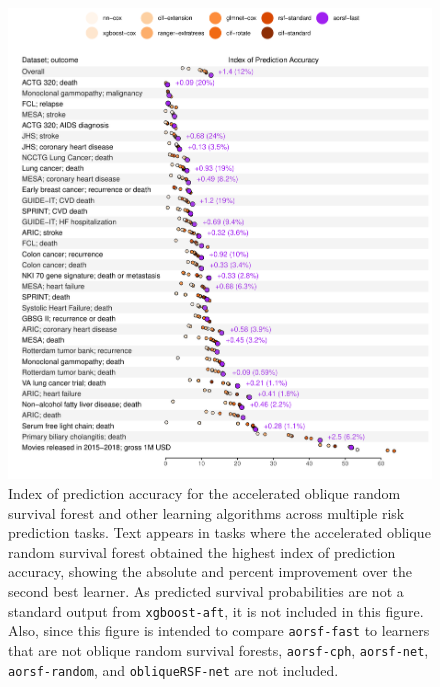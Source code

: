 \documentclass[twoside,11pt]{article}\usepackage[]{graphicx}\usepackage[]{xcolor}
\makeatletter
\def\maxwidth{ %
  \ifdim\Gin@nat@width>\linewidth
    \linewidth
  \else
    \Gin@nat@width
  \fi
}
\newenvironment{knitrout}{}{} %
\makeatother
\begin{document}
\begin{knitrout}
\color{fgcolor}\begin{figure}
\includegraphics[width=\maxwidth]{figure/bm_pred_viz_ibs-1} \caption{Index of prediction accuracy for the accelerated oblique random survival forest and other learning algorithms across multiple risk prediction tasks. Text appears in tasks where the accelerated oblique random survival forest obtained the highest index of prediction accuracy, showing the absolute and percent improvement over the second best learner. As predicted survival probabilities are not a standard output from \texttt{xgboost-aft}, it is not included in this figure. Also, since this figure is intended to compare \texttt{aorsf-fast} to learners that are not oblique random survival forests, \texttt{aorsf-cph}, \texttt{aorsf-net}, \texttt{aorsf-random}, and \texttt{obliqueRSF-net} are not included.}\label{fig:bm_pred_viz_ibs}
\end{figure}

\end{knitrout}
\end{document}
